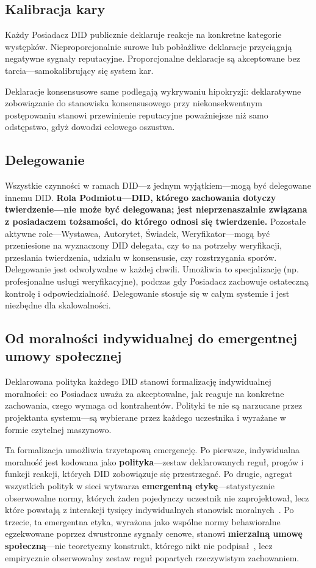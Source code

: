 \documentclass[11pt,a4paper,twocolumn]{article}
\begin{document}
\subsection{Kalibracja kary}

Każdy Posiadacz DID publicznie deklaruje reakcje na konkretne kategorie występków. Nieproporcjonalnie surowe lub pobłażliwe deklaracje przyciągają negatywne sygnały reputacyjne. Proporcjonalne deklaracje są akceptowane bez tarcia---samokalibrujący się system kar.

Deklaracje konsensusowe same podlegają wykrywaniu hipokryzji: deklaratywne zobowiązanie do stanowiska konsensusowego przy niekonsekwentnym postępowaniu stanowi przewinienie reputacyjne poważniejsze niż samo odstępstwo, gdyż dowodzi celowego oszustwa.

\subsection{Delegowanie}

Wszystkie czynności w ramach DID---z jednym wyjątkiem---mogą być delegowane innemu DID. \textbf{Rola Podmiotu---DID, którego zachowania dotyczy twierdzenie---nie może być delegowana; jest nieprzenaszalnie związana z posiadaczem tożsamości, do którego odnosi się twierdzenie.} Pozostałe aktywne role---Wystawca, Autorytet, Świadek, Weryfikator---mogą być przeniesione na wyznaczony DID delegata, czy to na potrzeby weryfikacji, przesłania twierdzenia, udziału w konsensusie, czy rozstrzygania sporów. Delegowanie jest odwoływalne w każdej chwili. Umożliwia to specjalizację (np. profesjonalne usługi weryfikacyjne), podczas gdy Posiadacz zachowuje ostateczną kontrolę i odpowiedzialność. Delegowanie stosuje się w całym systemie i jest niezbędne dla skalowalności.

\subsection{Od moralności indywidualnej do emergentnej umowy społecznej}

Deklarowana polityka każdego DID stanowi formalizację indywidualnej moralności: co Posiadacz uważa za akceptowalne, jak reaguje na konkretne zachowania, czego wymaga od kontrahentów. Polityki te nie są narzucane przez projektanta systemu---są wybierane przez każdego uczestnika i wyrażane w formie czytelnej maszynowo.

Ta formalizacja umożliwia trzyetapową emergencję. Po pierwsze, indywidualna moralność jest kodowana jako \textbf{polityka}---zestaw deklarowanych reguł, progów i funkcji reakcji, których DID zobowiązuje się przestrzegać. Po drugie, agregat wszystkich polityk w sieci wytwarza \textbf{emergentną etykę}---statystycznie obserwowalne normy, których żaden pojedynczy uczestnik nie zaprojektował, lecz które powstają z interakcji tysięcy indywidualnych stanowisk moralnych~\cite{durkheim1893}. Po trzecie, ta emergentna etyka, wyrażona jako wspólne normy behawioralne egzekwowane poprzez dwustronne sygnały cenowe, stanowi \textbf{mierzalną umowę społeczną}---nie teoretyczny konstrukt, którego nikt nie podpisał~\cite{rawls1971}, lecz empirycznie obserwowalny zestaw reguł popartych rzeczywistym zachowaniem.
\end{document}
